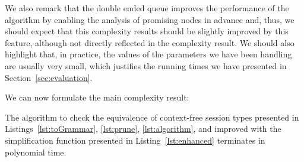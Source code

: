 We also remark that the double ended queue improves the 
performance of the algorithm by enabling the analysis of promising nodes 
in advance and, thus, we should expect that this complexity
results should be slightly improved by this feature, 
although not directly reflected in the complexity result.
We should also highlight that, in practice, the values of the 
parameters we have been handling are usually very small,
which justifies the running times we have presented in 
Section~\ref{sec:evaluation}.

We can now formulate the main complexity result:

\begin{theorem}
	The algorithm to check the equivalence of context-free 
	session types presented in Listings~\ref{lst:toGrammar},
	\ref{lst:prune}, \ref{lst:algorithm}, and improved with the
	simplification function presented in Listing~\ref{lst:enhanced}
	terminates in polynomial time.
\end{theorem}


























